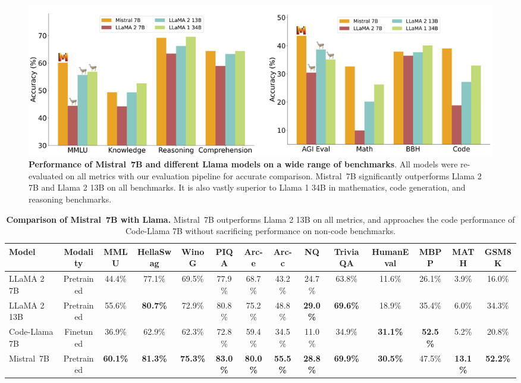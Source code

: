 \documentclass{article}
\def\llama{Llama\xspace}
\def\mistral{Mistral~7B\xspace}
\begin{document}
\begin{figure}
\centering
\includegraphics[width=0.99\linewidth,height=\textheight,keepaspectratio]{images/230927_bars.png}
\caption{\small \textbf{Performance of \mistral and different \llama models on a wide range of benchmarks}. All models were re-evaluated on all metrics with our evaluation pipeline for accurate comparison. \mistral significantly outperforms \llama 2 7B and \llama 2 13B on all benchmarks. It is also vastly superior to \llama 1 34B in mathematics, code generation, and reasoning benchmarks.}
\label{fig:bars}
\end{figure}

\setlength{\tabcolsep}{1.8pt}
\begin{table}
{\scriptsize
\centering
\begin{tabular}{@{}lccccccccccccc@{}}
\toprule
Model         & Modality   & MMLU            & HellaSwag       & WinoG      & PIQA            & Arc-e           & Arc-c           & NQ              & TriviaQA        & HumanEval       & MBPP            & MATH            & GSM8K           \\ \midrule
LLaMA 2 7B    & Pretrained & 44.4\%          & 77.1\%          & 69.5\%          & 77.9\%          & 68.7\%          & 43.2\%          & 24.7\%          & 63.8\%          & 11.6\%          & 26.1\%          & 3.9\%           & 16.0\%          \\
LLaMA 2 13B   & Pretrained & 55.6\%          & \textbf{80.7\%} & 72.9\%          & 80.8\%          & 75.2\%          & 48.8\%          & \textbf{29.0\%} & \textbf{69.6\%} & 18.9\%          & 35.4\%          & 6.0\%           & 34.3\%          \\ \midrule
Code-\llama 7B & Finetuned  & 36.9\%          & 62.9\%          & 62.3\%          & 72.8\%          & 59.4\%          & 34.5\%          & 11.0\%          & 34.9\%          & \textbf{31.1\%} & \textbf{52.5\%} & 5.2\%           & 20.8\%          \\ \midrule
\mistral    & Pretrained & \textbf{60.1\%} & \textbf{81.3\%} & \textbf{75.3\%} & \textbf{83.0\%} & \textbf{80.0\%} & \textbf{55.5\%} & \textbf{28.8\%} & \textbf{69.9\%} & \textbf{30.5\%} & 47.5\%          & \textbf{13.1\%} & \textbf{52.2\%} \\ \bottomrule
\end{tabular}
}
\vspace{4pt}
\caption{\small \textbf{Comparison of \mistral with \llama.} \mistral outperforms \llama 2 13B on all metrics, and approaches the code performance of Code-\llama 7B without sacrificing performance on non-code benchmarks.}
\label{tab:results}
\end{table}
\end{document}

